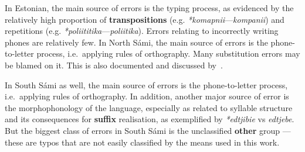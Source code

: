 \documentclass{flammie}
\begin{document}
In Estonian, the main source of errors is the typing process, as evidenced by
the relatively high proportion of \textbf{transpositions} (e.g.
\textit{*komapnii}---\textit{kompanii}) and repetitions (e.g.
\textit{*poliititika}---\textit{poliitika}). Errors relating to incorrectly
writing phones are relatively few.  In North Sámi, the main source of errors is
the phone-to-letter process, i.e.\ applying rules of orthography. Many
substitution errors may be blamed on it. This is also documented and discussed
by~\cite{antonsen2013callinmeattahusaid}.

In South Sámi as well, the main source of errors is the phone-to-letter process,
i.e.\ applying rules of orthography. In addition, another major source of error
is the morphophonology of the language, especially as related to syllable
structure and its consequences for \textbf{suffix} realisation, as exemplified
by \textit{*edtjibie} vs \textit{edtjebe}. But the biggest class of errors in
South Sámi is the unclassified \textbf{other} group --- these are typos that are
not easily classified by the means used in this work.
\end{document}
